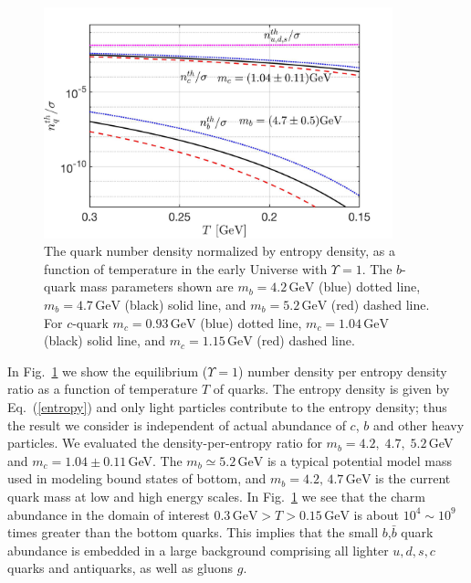 \begin{figure}[t]
\begin{center}
\includegraphics[width=0.9\textwidth]{./plots/bcQuarkDensity_new}
\caption{
The quark number density normalized by entropy density, as a function of temperature in the early Universe with $\Upsilon=1$. The $b$-quark mass parameters shown are $m_b=4.2\,\mathrm{GeV}$ (blue) dotted line, $m_b=4.7\,\mathrm{GeV}$ (black) solid line, and $m_b=5.2\,\mathrm{GeV}$ (red) dashed line. For  $c$-quark  $m_c=0.93\,\mathrm{GeV}$  (blue) dotted line, $m_c=1.04\,\mathrm{GeV}$ (black) solid line, and $m_c=1.15\,\mathrm{GeV}$ (red) dashed line.}
\label{number_entropy_b002}
\end{center}
\end{figure}


In Fig.~\ref{number_entropy_b002} we show the equilibrium ($\Upsilon=1$) number density per entropy density  ratio as a function of temperature $T$ of quarks. The entropy density is given by Eq.~(\ref{entropy}) and only light particles contribute to the entropy density; thus the result we consider is independent of actual abundance of $c$, $b$ and other heavy particles. We evaluated the density-per-entropy ratio for  $m_b=4.2,\;4.7,\;5.2$\,GeV and $m_c=1.04\pm0.11$\,GeV. The $m_b\simeq 5.2\,\mathrm{GeV}$ is  a typical potential model mass used in modeling bound states of bottom, and $m_b=4.2,\,4.7\,\mathrm{GeV}$ is the current quark mass at low and high energy scales. In Fig.~\ref{number_entropy_b002} we see that the charm abundance in the domain of interest $0.3\,\mathrm{GeV}>T>0.15\,\mathrm{GeV}$ is about $10^4\sim\!\!10^{9}$ times greater than the bottom quarks. This implies that the small $b$,$\bar b$ quark abundance is embedded in a large background comprising all lighter $u,d,s,c$ quarks and antiquarks, as well as gluons $g$.

